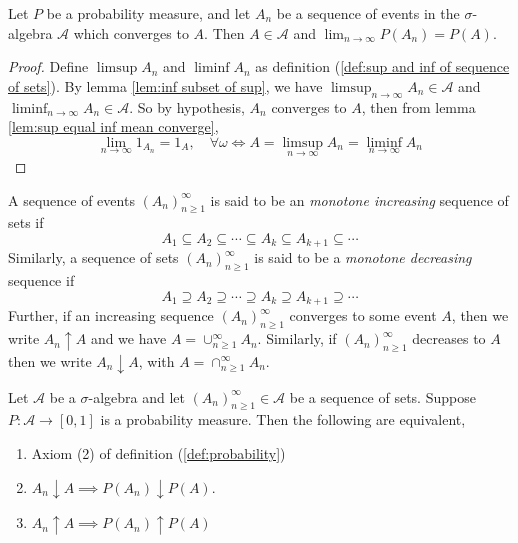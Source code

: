 \documentclass[../main.tex]{subfiles}
\begin{document}
\begin{theorem}
    Let $P$ be a probability measure, and let $A_n$ be a sequence of events in the $\sigma$-algebra $\mathcal{A}$
    which converges to $A$. Then $A \in \mathcal{A}$ and $\lim_{n\to\infty}{P(A_n)} = P(A)$.
    \end{theorem}
    
\begin{proof}
    Define $\limsup{A_n}$ and $\liminf{A_n}$ as definition (\ref{def:sup and inf of sequence of sets}). 
    By lemma \ref{lem:inf subset of sup}, we have $\limsup_{n\to\infty}{A_n}\in \mathcal{A}$
    and $\liminf_{n\to\infty}{A_n}\in \mathcal{A}$. So by hypothesis, 
    $A_n$ converges to $A$, then from lemma \ref{lem:sup equal inf mean converge}, \[
    \lim_{n\to\infty}{1_{A_n}} = 1_A, \quad \forall \omega \iff A = \limsup_{n \to \infty}{A_n} = \liminf_{n \to \infty}{A_n} 
    \]
\end{proof}


\begin{definition}\label{def:Increasing or Decreasing Sequence of Sets}
A sequence of events $(A_n)^\infty_{n\geq 1}$ is said to be an \textit{monotone increasing} sequence of sets if \[
A_1 \subseteq A_2 \subseteq \cdots \subseteq A_k \subseteq A_{k+1} \subseteq \cdots
\]
Similarly, a sequence of sets $(A_n)^\infty_{n\geq 1}$ is said to be a \textit{monotone decreasing} sequence if \[
A_1 \supseteq A_2 \supseteq \cdots \supseteq A_k \supseteq A_{k+1} \supseteq \cdots
\]
Further, if an increasing sequence $(A_n)^\infty_{n\geq 1}$ converges to some event $A$, then we write $A_n \uparrow A$ and we have $A = \cup^\infty_{n\geq 1}{A_n}$. Similarly, 
if $(A_n)^\infty_{n\geq 1}$ decreases to $A$ then we write $A_n \downarrow A$, with  $A = \cap^\infty_{n\geq 1}{A_n}$.
\end{definition}












\begin{theorem}\label{thm:convergence of P of seq of sets}
Let $\mathcal{A}$ be a $\sigma$-algebra and let $(A_n)^\infty_{n\geq 1} \in \mathcal{A}$ be a sequence of sets. Suppose $P: \mathcal{A}\to [0,1]$ is a probability measure.
Then the following are equivalent, 
\begin{enumerate}
    \item Axiom (2) of definition (\ref{def:probability})
    \item $A_n \downarrow A \implies P(A_n) \downarrow P(A)$.
    \item $A_n \uparrow A \implies P(A_n) \uparrow P(A)$
\end{enumerate}
\end{theorem}
\end{document}
